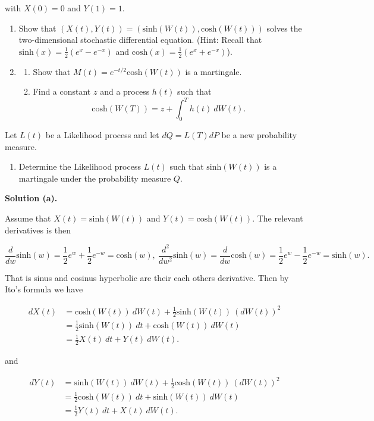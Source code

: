 \documentclass[
]{article}
\providecommand{\tightlist}{%
  \setlength{\itemsep}{0pt}\setlength{\parskip}{0pt}}
\begin{document}
with \(X(0)=0\) and \(Y(1)=1\).

\begin{enumerate}
\def\labelenumi{\alph{enumi}.}
\item
  Show that \((X(t),Y(t))=(\text{sinh}(W(t)),\text{cosh}(W(t)))\) solves
  the two-dimensional stochastic differential equation. (Hint: Recall
  that \(\text{sinh}(x)=\frac{1}{2}(e^x-e^{-x})\) and
  \(\text{cosh}(x)=\frac{1}{2}(e^x+e^{-x})\)).
\item
  \begin{enumerate}
  \def\labelenumii{\roman{enumii}.}
  \tightlist
  \item
    Show that \(M(t)=e^{-t/2}\text{cosh}(W(t))\) is a martingale.
  \item
    Find a constant \(z\) and a process \(h(t)\) such that \[
    \text{cosh}(W(T))=z+\int_0^Th(t)\ dW(t).
    \]
  \end{enumerate}
\end{enumerate}

Let \(L(t)\) be a Likelihood process and let \(dQ=L(T)dP\) be a new
probability measure.

\begin{enumerate}
\def\labelenumi{\alph{enumi}.}
\setcounter{enumi}{2}
\tightlist
\item
  Determine the Likelihood process \(L(t)\) such that
  \(\text{sinh}(W(t))\) is a martingale under the probability measure
  \(Q\).
\end{enumerate}

\textbf{Solution (a).}

Assume that \(X(t)=\text{sinh}(W(t))\) and \(Y(t)=\text{cosh}(W(t))\).
The relevant derivatives is then

\[
\frac{d}{dw}\text{sinh}(w)=\frac{1}{2}e^w+\frac{1}{2}e^{-w}=\text{cosh}(w),\ \frac{d^2}{dw^2}\text{sinh}(w)=\frac{d}{dw}\text{cosh}(w)=\frac{1}{2}e^w-\frac{1}{2}e^{-w}=\text{sinh}(w).
\]

That is sinus and cosinus hyperbolic are their each others derivative.
Then by Ito's formula we have

\begin{align*}
dX(t)&=\text{cosh}(W(t))\ dW(t)+\frac{1}{2}\text{sinh}(W(t))\ (dW(t))^2\\
&=\frac{1}{2}\text{sinh}(W(t))\ dt+\text{cosh}(W(t))\ dW(t)\\
&=\frac{1}{2}X(t)\ dt+Y(t)\ dW(t).
\end{align*}

and

\begin{align*}
dY(t)&=\text{sinh}(W(t))\ dW(t)+\frac{1}{2}\text{cosh}(W(t))\ (dW(t))^2\\
&=\frac{1}{2}\text{cosh}(W(t))\ dt+\text{sinh}(W(t))\ dW(t)\\
&=\frac{1}{2}Y(t)\ dt+X(t)\ dW(t).
\end{align*}
\end{document}
